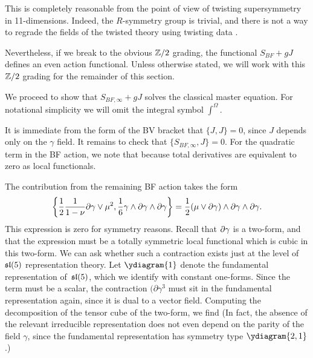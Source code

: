 This is completely reasonable from the point of view of twisting supersymmetry in 11-dimensions. 
Indeed, the $R$-symmetry group is trivial, and there is not a way to regrade the fields of the twisted theory using twisting data \label{CosHol,ESW}. 

Nevertheless, if we break to the obvious $\mathbb Z/2$ grading, the functional $S_{BF} + g J$ defines an even action functional.
Unless otherwise stated, we will work with this $\mathbb Z/2$ grading for the remainder of this section.

\parsec[]
We proceed to show that $S_{BF,\infty} + g J$ solves the classical master equation.
For notational simplicity we will omit the integral symbol $\int^\Omega$.


It is immediate from the form of the BV bracket that $\{J,J\} = 0$, since $J$ depends only on the $\gamma$ field. 
It remains to check that $\{S_{BF,\infty},J\} = 0$. 
For the quadratic term in the BF action, we note that 
  because total derivatives are equivalent to zero as local functionals. 
  
The contribution from the remaining BF action takes the form
\[
    \left\{ \frac12 \frac{1}{1-\nu} \partial\gamma \vee \mu^2, \frac16 \gamma \wedge \partial\gamma \wedge \partial \gamma \right\} =\frac12 (\mu \vee \partial \gamma) \wedge \partial \gamma \wedge \partial \gamma .
\]
This expression is zero for symmetry reasons. 
Recall that $\partial\gamma$ is a two-form, and that the expression must be a totally symmetric local functional which is cubic in this two-form. We can ask whether such a  contraction exists just at the level of $\mathfrak{sl}(5)$ representation theory. Let $\ydiagram{1}$ denote the fundamental representation of~$\mathfrak{sl}(5)$, which we identify with constant one-forms. Since the term must be a scalar, the contraction $(\partial\gamma^3$ must sit in the fundamental representation again, since it is dual to a vector field. Computing the decomposition of the tensor cube of the two-form, we find
(In fact, the absence  of the relevant irreducible representation does not  even depend on the parity of the  field $\gamma$, since 
the  fundamental representation has symmetry type $\ydiagram{2,1}$.) 

